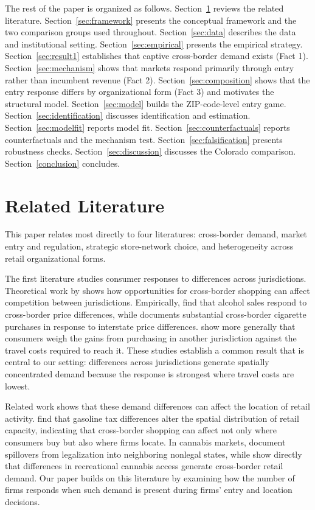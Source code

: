 \documentclass[english,12pt]{article}
\begin{document}
The rest of the paper is organized as follows. Section~\ref{litreview} reviews the related literature. Section~\ref{sec:framework} presents the conceptual framework and the two comparison groups used throughout. Section~\ref{sec:data} describes the data and institutional setting. Section~\ref{sec:empirical} presents the empirical strategy. Section~\ref{sec:result1} establishes that captive cross-border demand exists (Fact 1). Section~\ref{sec:mechanism} shows that markets respond primarily through entry rather than incumbent revenue (Fact 2). Section~\ref{sec:composition} shows that the entry response differs by organizational form (Fact 3) and motivates the structural model. Section~\ref{sec:model} builds the ZIP-code-level entry game. Section~\ref{sec:identification} discusses identification and estimation. Section~\ref{sec:modelfit} reports model fit. Section~\ref{sec:counterfactuals} reports counterfactuals and the mechanism test. Section~\ref{sec:falsification} presents robustness checks. Section~\ref{sec:discussion} discusses the Colorado comparison. Section~\ref{conclusion} concludes.

\section{Related Literature}
\label{litreview}

This paper relates most directly to four literatures: cross-border demand, market entry and regulation, strategic store-network choice, and heterogeneity across retail organizational forms.

The first literature studies consumer responses to differences across jurisdictions. Theoretical work by \citet{KanburKeen1993} shows how opportunities for cross-border shopping can affect competition between jurisdictions. Empirically, \citet{AsplundFribergWilander2007} find that alcohol sales respond to cross-border price differences, while \citet{Lovenheim2008} documents substantial cross-border cigarette purchases in response to interstate price differences. \citet{ChandraHeadTappata2014} show more generally that consumers weigh the gains from purchasing in another jurisdiction against the travel costs required to reach it. These studies establish a common result that is central to our setting: differences across jurisdictions generate spatially concentrated demand because the response is strongest where travel costs are lowest.

Related work shows that these demand differences can affect the location of retail activity. \citet{ManuszakMoul2009} find that gasoline tax differences alter the spatial distribution of retail capacity, indicating that cross-border shopping can affect not only where consumers buy but also where firms locate. In cannabis markets, \citet{HaoCowan2020} document spillovers from legalization into neighboring nonlegal states, while \citet{HansenMillerWeber2020} show directly that differences in recreational cannabis access generate cross-border retail demand. Our paper builds on this literature by examining how the number of firms responds when such demand is present during firms' entry and location decisions.
\end{document}
